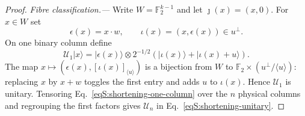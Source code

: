 \documentclass[journal,twocolumn]{IEEEtran}
\theoremstyle{definition}
\theoremstyle{plain}
\newcommand{\F}{\mathbb F}
\begin{document}
\begin{proof}
\smallskip\noindent\emph{Fibre classification.---}
Write $W=\F_2^{k-1}$ and let $\jmath(x)=(x,0)$.  For $x\in W$ set
\begin{equation}
 \epsilon(x)=x\cdot w,\qquad \iota(x)=(x,\epsilon(x))\in u^\perp.
\end{equation}
On one binary column define
\begin{equation}
 \mathcal U_1|x\rangle
 =|\epsilon(x)\rangle\otimes2^{-1/2}
  (|\iota(x)\rangle+|\iota(x)+u\rangle).
 \label{eqS:shortening-one-column}
\end{equation}
The map
$x\mapsto(\epsilon(x),[\iota(x)]_{\langle u\rangle})$ is a bijection from
$W$ to $\F_2\times(u^\perp/\langle u\rangle)$: replacing $x$ by $x+w$
toggles the first entry and adds $u$ to $\iota(x)$.  Hence
$\mathcal U_1$ is unitary.  Tensoring Eq.~\eqref{eqS:shortening-one-column}
over the $n$ physical columns and regrouping the first factors gives
$\mathcal U_n$ in Eq.~\eqref{eqS:shortening-unitary}.


\end{proof}
\end{document}
